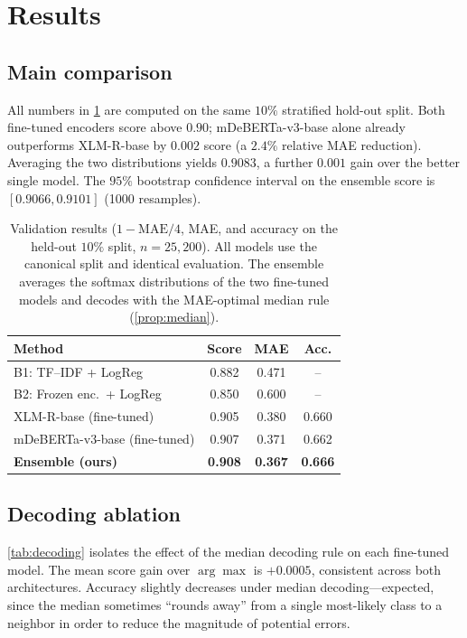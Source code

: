 \documentclass{article}
\theoremstyle{plain}
\theoremstyle{definition}
\theoremstyle{remark}
\begin{document}
\section{Results}
\label{sec:results}

\subsection{Main comparison}
\label{sec:main-comparison}
All numbers in \cref{tab:main} are computed on the same $10\%$
stratified hold-out split. Both fine-tuned encoders score above
$0.90$; mDeBERTa-v3-base alone already outperforms XLM-R-base by
$0.002$ score (a $2.4\%$ relative MAE reduction). Averaging the two
distributions yields $0.9083$, a further $0.001$ gain over the better
single model. The $95\%$ bootstrap confidence interval on the ensemble
score is $[0.9066,0.9101]$ (1000 resamples).

\begin{table}[t]
\caption{Validation results ($1-\mathrm{MAE}/4$, MAE, and accuracy on
the held-out $10\%$ split, $n{=}25{,}200$). All models use the
canonical split and identical evaluation. The ensemble averages the
softmax distributions of the two fine-tuned models and decodes with
the MAE-optimal median rule (\cref{prop:median}).}
\label{tab:main}
\vskip 0.05in
\begin{center}
\begin{small}
\begin{tabular}{lccc}
\toprule
Method                      & Score & MAE   & Acc.   \\
\midrule
B1: TF--IDF + LogReg        & 0.882 & 0.471 & --     \\
B2: Frozen enc.\ + LogReg   & 0.850 & 0.600 & --     \\
XLM-R-base (fine-tuned)     & 0.905 & 0.380 & 0.660 \\
mDeBERTa-v3-base (fine-tuned)& 0.907 & 0.371 & 0.662 \\
\textbf{Ensemble (ours)}    & \textbf{0.908} & \textbf{0.367} & \textbf{0.666} \\
\bottomrule
\end{tabular}
\end{small}
\end{center}
\vskip -0.1in
\end{table}

\subsection{Decoding ablation}
\label{sec:ablation}
\cref{tab:decoding} isolates the effect of the median decoding rule on
each fine-tuned model. The mean score gain over $\arg\max$ is
$+0.0005$, consistent across both architectures. Accuracy
slightly decreases under median decoding---expected, since the median
sometimes ``rounds away'' from a single most-likely class to a
neighbor in order to reduce the magnitude of potential errors.
\end{document}
